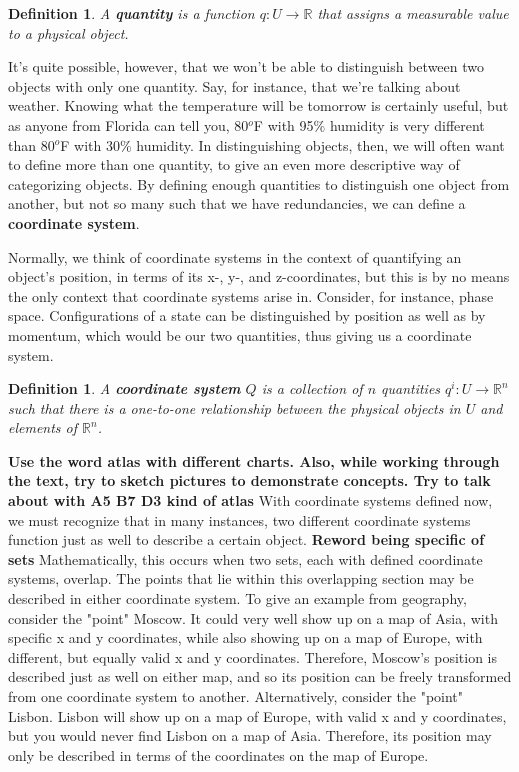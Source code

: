 \documentclass{book}
\newtheorem{defn}[equation]{Definition}
\begin{document}
\begin{defn}
	A \textbf{quantity} is a function $q : U \to \mathbb{R}$ that assigns a measurable value to a physical object.
\end{defn}



It's quite possible, however, that we won't be able to distinguish between two objects with only one quantity. Say, for instance, that we're talking about weather. Knowing what the temperature will be tomorrow is certainly useful, but as anyone from Florida can tell you, 80$^o$F with 95$\%$ humidity is very different than 80$^o$F with 30$\%$ humidity. In distinguishing objects, then, we will often want to define more than one quantity, to give an even more descriptive way of categorizing objects. By defining enough quantities to distinguish one object from another, but not so many such that we have redundancies, we can define a \textbf{coordinate system}.

Normally, we think of coordinate systems in the context of quantifying an object's position, in terms of its x-, y-, and z-coordinates, but this is by no means the only context that coordinate systems arise in. Consider, for instance, phase space. Configurations of a state can be distinguished by position as well as by momentum, which would be our two quantities, thus giving us a coordinate system. 

\begin{defn}
	A \textbf{coordinate system} $Q$ is a collection of $n$ quantities $q^i : U \to \mathbb{R}^n$ such that there is a one-to-one relationship between the physical objects in $U$ and elements of $\mathbb{R}^n$.
\end{defn}





\textbf{Use the word atlas with different charts. Also, while working through the text, try to sketch pictures to demonstrate concepts. Try to talk about with A5 B7 D3 kind of atlas}
With coordinate systems defined now, we must recognize that in many instances, two different coordinate systems function just as well to describe a certain object. \textbf{Reword being specific of sets} Mathematically, this occurs when two sets, each with defined coordinate systems, overlap. The points that lie within this overlapping section may be described in either coordinate system. To give an example from geography, consider the "point" Moscow. It could very well show up on a map of Asia, with specific x and y coordinates, while also showing up on a map of Europe, with different, but equally valid x and y coordinates. Therefore, Moscow's position is described just as well on either map, and so its position can be freely transformed from one coordinate system to another. Alternatively, consider the "point" Lisbon. Lisbon will show up on a map of Europe, with valid x and y coordinates, but you would never find Lisbon on a map of Asia. Therefore, its position may only be described in terms of the coordinates on the map of Europe.
\end{document}
